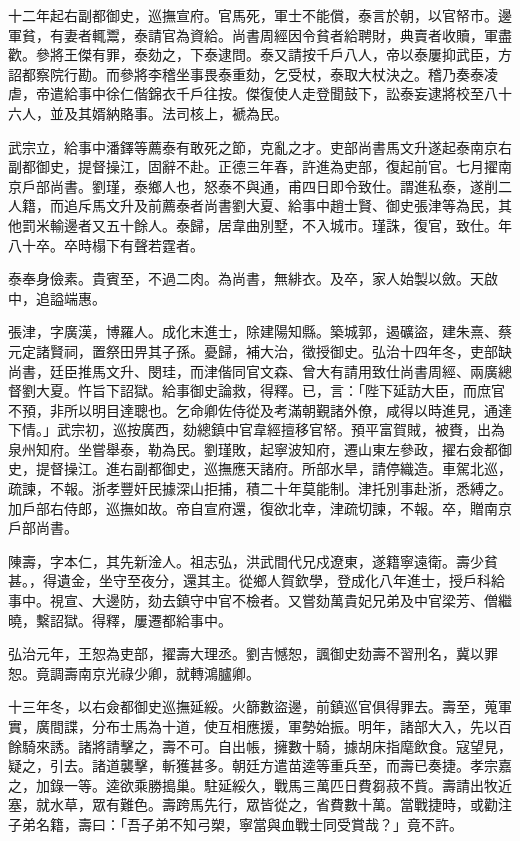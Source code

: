 \begin{pinyinscope}
十二年起右副都御史，巡撫宣府。官馬死，軍士不能償，泰言於朝，以官帑市。邊軍貧，有妻者輒鬻，泰請官為資給。尚書周經因令貧者給聘財，典賣者收贖，軍盡歡。參將王傑有罪，泰劾之，下泰逮問。泰又請按千戶八人，帝以泰屢抑武臣，方詔都察院行勘。而參將李稽坐事畏泰重劾，乞受杖，泰取大杖決之。稽乃奏泰凌虐，帝遣給事中徐仁偕錦衣千戶往按。傑復使人走登聞鼓下，訟泰妄逮將校至八十六人，並及其婿納賂事。法司核上，褫為民。

武宗立，給事中潘鐸等薦泰有敢死之節，克亂之才。吏部尚書馬文升遂起泰南京右副都御史，提督操江，固辭不赴。正德三年春，許進為吏部，復起前官。七月擢南京戶部尚書。劉瑾，泰鄉人也，怒泰不與通，甫四日即令致仕。謂進私泰，遂削二人籍，而追斥馬文升及前薦泰者尚書劉大夏、給事中趙士賢、御史張津等為民，其他罰米輸邊者又五十餘人。泰歸，居韋曲別墅，不入城市。瑾誅，復官，致仕。年八十卒。卒時榻下有聲若霆者。

泰奉身儉素。貴賓至，不過二肉。為尚書，無緋衣。及卒，家人始製以斂。天啟中，追謚端惠。

張津，字廣漢，博羅人。成化末進士，除建陽知縣。築城郭，遏礦盜，建朱熹、蔡元定諸賢祠，置祭田畀其子孫。憂歸，補大治，徵授御史。弘治十四年冬，吏部缺尚書，廷臣推馬文升、閔珪，而津偕同官文森、曾大有請用致仕尚書周經、兩廣總督劉大夏。忤旨下詔獄。給事御史論救，得釋。已，言：「陛下延訪大臣，而庶官不預，非所以明目達聰也。乞命卿佐侍從及考滿朝覲諸外僚，咸得以時進見，通達下情。」武宗初，巡按廣西，劾總鎮中官韋經擅移官帑。預平富賀賊，被賚，出為泉州知府。坐嘗舉泰，勒為民。劉瑾敗，起寧波知府，遷山東左參政，擢右僉都御史，提督操江。進右副都御史，巡撫應天諸府。所部水旱，請停織造。車駕北巡，疏諫，不報。浙孝豐奸民據深山拒捕，積二十年莫能制。津托別事赴浙，悉縛之。加戶部右侍郎，巡撫如故。帝自宣府還，復欲北幸，津疏切諫，不報。卒，贈南京戶部尚書。

陳壽，字本仁，其先新淦人。祖志弘，洪武間代兄戍遼東，遂籍寧遠衛。壽少貧甚。，得遺金，坐守至夜分，還其主。從鄉人賀欽學，登成化八年進士，授戶科給事中。視宣、大邊防，劾去鎮守中官不檢者。又嘗劾萬貴妃兄弟及中官梁芳、僧繼曉，繫詔獄。得釋，屢遷都給事中。

弘治元年，王恕為吏部，擢壽大理丞。劉吉憾恕，諷御史劾壽不習刑名，冀以罪恕。竟調壽南京光祿少卿，就轉鴻臚卿。

十三年冬，以右僉都御史巡撫延綏。火篩數盜邊，前鎮巡官俱得罪去。壽至，蒐軍實，廣間諜，分布士馬為十道，使互相應援，軍勢始振。明年，諸部大入，先以百餘騎來誘。諸將請擊之，壽不可。自出帳，擁數十騎，據胡床指麾飲食。寇望見，疑之，引去。諸道襲擊，斬獲甚多。朝廷方遣苗逵等重兵至，而壽已奏捷。孝宗嘉之，加錄一等。逵欲乘勝搗巢。駐延綏久，戰馬三萬匹日費芻菽不貲。壽請出牧近塞，就水草，眾有難色。壽跨馬先行，眾皆從之，省費數十萬。當戰捷時，或勸注子弟名籍，壽曰：「吾子弟不知弓槊，寧當與血戰士同受賞哉？」竟不許。


\end{pinyinscope}

